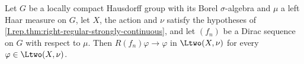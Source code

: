 Let $G$ be a locally compact Hausdorff group with its Borel $\sigma$-algebra and $\mu$ a left Haar measure on $G$, let
$X$, the action and $\nu$ satisfy the hypotheses of \cref{I.rep.thm:right-regular-strongly-continuous}, and let
$(f_n)$ be a Dirac sequence on $G$ with respect to $\mu$. Then $R(f_n)\varphi\to\varphi$ in $\Ltwo(X,\nu)$ for every
$\varphi\in\Ltwo(X,\nu)$.
